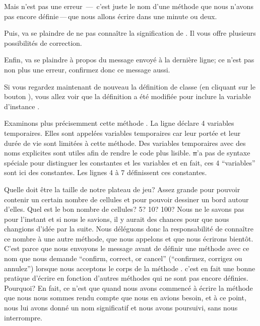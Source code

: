 \documentclass[a4paper,10pt,twoside]{book}
\begin{document}
Mais  n'est pas une erreur \,---\, c'est juste le nom d'une méthode que nous n'avons pas encore définie\,---\,que nous allons écrire dans une minute ou deux.


Puis, \sq va se plaindre de ne pas connaître la signification de . Il vous offre plusieurs possibilités de correction.

Enfin, \sq va se plaindre à propos du message 
envoyé à la dernière ligne; ce n'est pas non plus une erreur,
confirmez donc ce message aussi.

Si vous regardez maintenant de nouveau la définition de classe (en cliquant sur le bouton ), vous allez voir que la définition a été modifiée pour inclure la variable d'instance .

Examinons plus précisemment cette méthode .
La ligne \mbox{} déclare 4 variables temporaires. Elles sont appelées variables temporaires car leur portée et leur durée de vie sont limitées à cette méthode. Des variables temporaires avec des noms explicites sont utiles afin de rendre le code plus lisible. \st n'a pas de syntaxe spéciale pour distinguer les constantes et les variables et en fait, ces 4 ``variables'' sont ici des constantes. Les lignes 4 à 7 définissent ces constantes.

Quelle doit \^etre la taille de notre plateau de jeu? Assez grande pour pouvoir contenir un certain nombre de cellules et pour pouvoir dessiner un bord autour d'elles.
Quel est le bon nombre de cellules? 5? 10? 100? Nous ne le savons pas
pour l'instant et si nous le savions, il y aurait des chances pour que
nous changions d'idée par la suite. Nous déléguons donc la
responsabilité de connaître ce nombre à une autre méthode, que nous
appelons  et que nous écrirons 
bient\^ot.
C'est parce que nous envoyons le message  avant de
définir une méthode avec ce nom que \sq nous demande ``confirm,
correct, or cancel'' (\cad ``confirmez, corrigez ou annulez'') lorsque
nous acceptons le corps de la méthode \mbox{.}
c'est en fait une bonne pratique d'écrire en fonction d'autres méthodes qui ne sont pas encore définies.
Pourquoi? En fait, ce n'est que quand nous avons commencé à écrire la
méthode  que nous nous sommes rendu compte que nous en
avions besoin, et à ce point, nous lui avons donné un nom 
significatif et nous avons poursuivi, sans nous interrompre.
 
\end{document}
